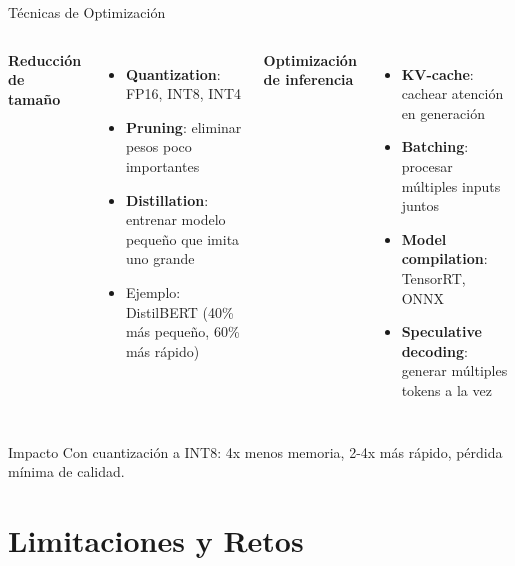 \begin{frame}{Técnicas de Optimización}

\begin{columns}
\textbf{Reducción de tamaño}
\begin{itemize}
    \item \textbf{Quantization}: FP16, INT8, INT4
    \item \textbf{Pruning}: eliminar pesos poco importantes
    \item \textbf{Distillation}: entrenar modelo pequeño que imita uno grande
    \item Ejemplo: DistilBERT (40\% más pequeño, 60\% más rápido)
\end{itemize}

\textbf{Optimización de inferencia}
\begin{itemize}
    \item \textbf{KV-cache}: cachear atención en generación
    \item \textbf{Batching}: procesar múltiples inputs juntos
    \item \textbf{Model compilation}: TensorRT, ONNX
    \item \textbf{Speculative decoding}: generar múltiples tokens a la vez
\end{itemize}

\end{columns}

\vspace{1em}

\begin{exampleblock}{Impacto}
Con cuantización a INT8: 4x menos memoria, 2-4x más rápido, pérdida mínima de calidad.
\end{exampleblock}

\end{frame}

\section{Limitaciones y Retos}

